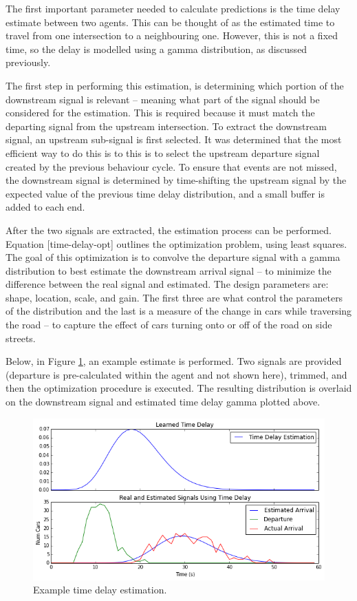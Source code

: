 \documentclass{report}
\begin{document}
The first important parameter needed to calculate predictions is the time delay estimate between two agents. 
This can be thought of as the estimated time to travel from one intersection to a neighbouring one. 
However, this is not a fixed time, so the delay is modelled using a gamma distribution, as discussed previously. 

The first step in performing this estimation, is determining which portion of the downstream signal is relevant – meaning what part of the signal should be considered for the estimation. 
This is required because it must match the departing signal from the upstream intersection. 
To extract the downstream signal, an upstream sub-signal is first selected. It was determined that the most efficient way to do this is to this is to select the upstream departure signal created by the previous behaviour cycle. 
To ensure that events are not missed, the downstream signal is determined by time-shifting the upstream signal by the expected value of the previous time delay distribution, and a small buffer is added to each end.

After the two signals are extracted, the estimation process can be performed. 
Equation [time-delay-opt] outlines the optimization problem, using least squares. 
The goal of this optimization is to convolve the departure signal with a gamma distribution to best estimate the downstream arrival signal -- to minimize the difference between the real signal and estimated. 
The design parameters are: shape, location, scale, and gain. 
The first three are what control the parameters of the distribution and the last is a measure of the change in cars while traversing the road -- to capture the effect of cars turning onto or off of the road on side streets.

Below, in Figure \ref{fig:time-delay-est}, an example estimate is performed. 
Two signals are provided (departure is pre-calculated within the agent and not shown here), trimmed, and then the optimization procedure is executed. 
The resulting distribution is overlaid on the downstream signal and estimated time delay gamma plotted above.

\begin{figure}[H]
  \begin{centering}
    \includegraphics[scale=0.75]{figures/time-delay-est.png}
    \caption{Example time delay estimation.}
    \label{fig:time-delay-est}
  \end{centering}
\end{figure}
\end{document}
